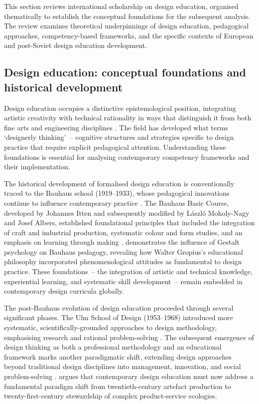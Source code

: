 \documentclass[ed]{acnsart}
\begin{document}
	This section reviews international scholarship on design education, organised thematically to establish the conceptual foundations for the subsequent analysis. The review examines theoretical underpinnings of design education, pedagogical approaches, competency-based frameworks, and the specific contexts of European and post-Soviet design education development.
	
	\subsection{Design education: conceptual foundations and historical development}
	
	Design education occupies a distinctive epistemological position, integrating artistic creativity with technical rationality in ways that distinguish it from both fine arts and engineering disciplines \cite{Cross2018691}. The field has developed what \citet{Oxman1999105} terms `designerly thinking'~-- cognitive structures and strategies specific to design practice that require explicit pedagogical attention. Understanding these foundations is essential for analysing contemporary competency frameworks and their implementation.
	
	The historical development of formalised design education is conventionally traced to the Bauhaus school (1919--1933), whose pedagogical innovations continue to influence contemporary practice \cite{Sturgis20209, Aynsley2022209}. The Bauhaus Basic Course, developed by Johannes Itten and subsequently modified by László Moholy-Nagy and Josef Albers, established foundational principles that included the integration of craft and industrial production, systematic colour and form studies, and an emphasis on learning through making \cite{Cross198343}. \citet{Sinico202199} demonstrates the influence of Gestalt psychology on Bauhaus pedagogy, revealing how Walter Gropius's educational philosophy incorporated phenomenological attitudes as fundamental to design practice. These foundations~-- the integration of artistic and technical knowledge, experiential learning, and systematic skill development~-- remain embedded in contemporary design curricula globally.
	
	The post-Bauhaus evolution of design education proceeded through several significant phases. The Ulm School of Design (1953--1968) introduced more systematic, scientifically-grounded approaches to design methodology, emphasising research and rational problem-solving \cite{Li2023}. The subsequent emergence of design thinking as both a professional methodology and an educational framework marks another paradigmatic shift, extending design approaches beyond traditional design disciplines into management, innovation, and social problem-solving \cite{Razzouk2012330}. \citet{Davis202397} argues that contemporary design education must now address a fundamental paradigm shift from twentieth-century artefact production to twenty-first-century stewardship of complex product-service ecologies.
	
\end{document}
